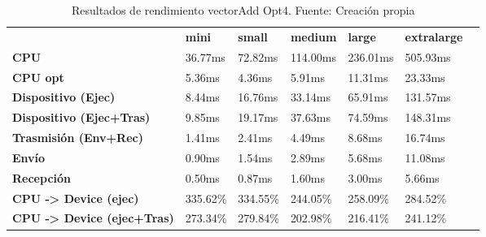\begin{table}[H]
    \centering
    \begin{tabular}{lllllll}
    \rowcolor[HTML]{DAE8FC} \ &  \textbf{mini} &  \textbf{small} &  \textbf{medium} &  \textbf{	large} &  \textbf{	extralarge} \\
    \cellcolor[HTML]{DAE8FC} \textbf{CPU} & 36.77ms & 72.82ms & 114.00ms & 	236.01ms & 	505.93ms \\
    \rowcolor[HTML]{EFEFEF} \cellcolor[HTML]{DAE8FC} \textbf{CPU opt} & 5.36ms & 4.36ms & 5.91ms & 	11.31ms & 	23.33ms \\
    \cellcolor[HTML]{DAE8FC} \textbf{Dispositivo (Ejec)} & 8.44ms & 16.76ms & 33.14ms & 	65.91ms & 	131.57ms \\
    \rowcolor[HTML]{EFEFEF} \cellcolor[HTML]{DAE8FC} \textbf{Dispositivo (Ejec+Tras)} & 9.85ms & 19.17ms & 37.63ms & 	74.59ms & 	148.31ms \\
    \cellcolor[HTML]{DAE8FC} \textbf{Trasmisión (Env+Rec)} & 1.41ms & 2.41ms & 4.49ms & 	8.68ms & 	16.74ms \\
    \rowcolor[HTML]{EFEFEF} \cellcolor[HTML]{DAE8FC} \textbf{Envío} & 0.90ms & 1.54ms & 2.89ms & 	5.68ms & 	11.08ms \\
    \cellcolor[HTML]{DAE8FC} \textbf{Recepción} & 0.50ms & 0.87ms & 1.60ms & 	3.00ms & 	5.66ms \\
    \rowcolor[HTML]{EFEFEF} \cellcolor[HTML]{DAE8FC} \textbf{CPU -> Device (ejec)} & 335.62\% & 334.55\% & 244.05\% & 	258.09\% & 	284.52\% \\
    \cellcolor[HTML]{DAE8FC} \textbf{CPU -> Device (ejec+Tras)} & 273.34\% & 279.84\% & 202.98\% & 	216.41\% & 	241.12\% \\
    \end{tabular}
    \caption[Resultados de rendimiento vectorAdd Opt4]{{Resultados de rendimiento vectorAdd Opt4. Fuente: Creación propia}}
    \label{table_test_vectorAdd_Opt4_hw_performanceResults}
\end{table}